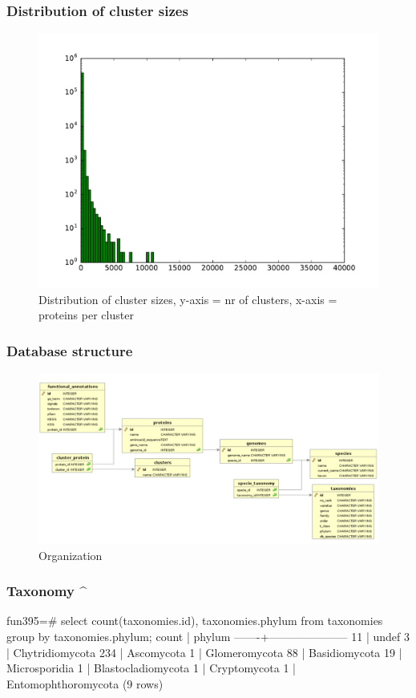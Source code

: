 \documentclass{beamer}
\begin{document}
\begin{frame}
\frametitle{Distribution of cluster sizes}
\label{sec-4}

\begin{figure}[htb]
\centering
\includegraphics[width=.9\linewidth]{./proteins_per_cluster.pdf}
\caption{Distribution of cluster sizes, y-axis = nr of clusters, x-axis = proteins per cluster}
\end{figure}
\end{frame}
\begin{frame}
\frametitle{Database structure}
\label{sec-5}

\begin{figure}[htb]
\centering
\includegraphics[width=.9\linewidth]{./presentation/database_structure_fun_395.pdf}
\caption{Organization}
\end{figure}
\end{frame}
\begin{frame}
\frametitle{Taxonomy                     ^}
\label{sec-6}

fun395=\# select count(taxonomies.id), taxonomies.phylum from taxonomies group by taxonomies.phylum;
 count |       phylum        
-------+---------------------
    11 | undef
     3 | Chytridiomycota
   234 | Ascomycota
     1 | Glomeromycota
    88 | Basidiomycota
    19 | Microsporidia
     1 | Blastocladiomycota
     1 | Cryptomycota
     1 | Entomophthoromycota
(9 rows)
\end{frame}
\end{document}
